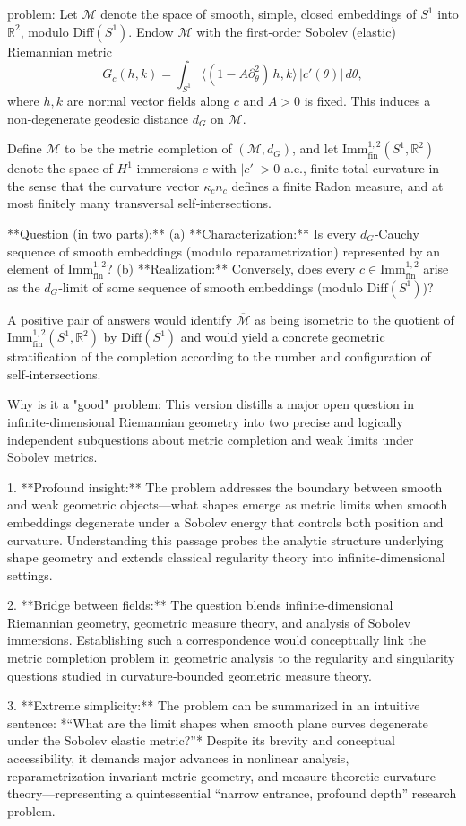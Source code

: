 problem:  
Let $\mathcal{M}$ denote the space of smooth, simple, closed embeddings of $S^{1}$ into $\mathbb{R}^{2}$, modulo $\mathrm{Diff}(S^{1})$. Endow $\mathcal{M}$ with the first‑order Sobolev (elastic) Riemannian metric
\[
G_c(h,k) = \int_{S^{1}} \langle (1 - A\partial_{\theta}^{2})\,h , k \rangle\,|c'(\theta)|\,d\theta,
\]
where $h,k$ are normal vector fields along $c$ and $A>0$ is fixed.  
This induces a non‑degenerate geodesic distance $d_G$ on $\mathcal{M}$.  

Define $\overline{\mathcal{M}}$ to be the metric completion of $(\mathcal{M},d_G)$, and let $\mathrm{Imm}^{1,2}_{\mathrm{fin}}(S^{1},\mathbb{R}^{2})$ denote the space of $H^{1}$‑immersions $c$ with $|c'|>0$ a.e., finite total curvature in the sense that the curvature vector $\kappa_c n_c$ defines a finite Radon measure, and at most finitely many transversal self‑intersections.

**Question (in two parts):**  
(a) **Characterization:** Is every $d_G$‑Cauchy sequence of smooth embeddings (modulo reparametrization) represented by an element of $\mathrm{Imm}^{1,2}_{\mathrm{fin}}$?  
(b) **Realization:** Conversely, does every $c \in \mathrm{Imm}^{1,2}_{\mathrm{fin}}$ arise as the $d_G$‑limit of some sequence of smooth embeddings (modulo $\mathrm{Diff}(S^1)$)?  

A positive pair of answers would identify $\overline{\mathcal{M}}$ as being isometric to the quotient of $\mathrm{Imm}^{1,2}_{\mathrm{fin}}(S^{1},\mathbb{R}^{2})$ by $\mathrm{Diff}(S^1)$ and would yield a concrete geometric stratification of the completion according to the number and configuration of self‑intersections.

Why is it a "good" problem:  
This version distills a major open question in infinite‑dimensional Riemannian geometry into two precise and logically independent subquestions about metric completion and weak limits under Sobolev metrics.  

1. **Profound insight:** The problem addresses the boundary between smooth and weak geometric objects—what shapes emerge as metric limits when smooth embeddings degenerate under a Sobolev energy that controls both position and curvature. Understanding this passage probes the analytic structure underlying shape geometry and extends classical regularity theory into infinite-dimensional settings.  

2. **Bridge between fields:** The question blends infinite‑dimensional Riemannian geometry, geometric measure theory, and analysis of Sobolev immersions. Establishing such a correspondence would conceptually link the metric completion problem in geometric analysis to the regularity and singularity questions studied in curvature‑bounded geometric measure theory.  

3. **Extreme simplicity:** The problem can be summarized in an intuitive sentence: *“What are the limit shapes when smooth plane curves degenerate under the Sobolev elastic metric?”* Despite its brevity and conceptual accessibility, it demands major advances in nonlinear analysis, reparametrization‑invariant metric geometry, and measure‑theoretic curvature theory—representing a quintessential “narrow entrance, profound depth” research problem.